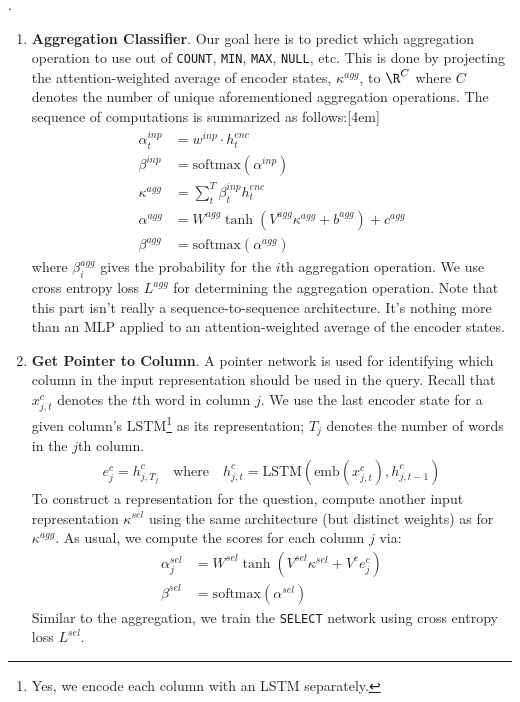 \documentclass[11pt]{article}
\begin{document}
\myspace
\p {}.
\begin{enumerate}
	\item \textbf{Aggregation Classifier}. Our goal here is to predict which aggregation operation to use out of \texttt{COUNT}, \texttt{MIN}, \texttt{MAX}, \texttt{NULL}, etc. This is done by projecting the attention-weighted average of encoder states, $\kappa^{agg}$, to $\R^{C}$ where $C$ denotes the number of unique aforementioned aggregation operations. The sequence of computations is summarized as follows:[4em]
	\begin{align}
	\alpha_t^{inp} 	&= w^{inp} \cdot h_t^{enc} \label{seq2sql-attn} \\
	\beta^{inp} 	&= \text{softmax}\left( \alpha^{inp} \right) \\
	\kappa^{agg} 	&= \sum_t^T \beta_t^{inp} h_t^{enc} \\
	\alpha^{agg} 	&= W^{agg} \tanh\left( V^{agg} \kappa^{agg} + b^{agg} \right) + c^{agg} \\
	\beta^{agg} 	&= \text{softmax}\left( \alpha^{agg} \right)
	\end{align}
	where $\beta_i^{agg}$ gives the probability for the $i$th aggregation operation. We use cross entropy loss $L^{agg}$ for determining the aggregation operation. Note that this part isn't really a sequence-to-sequence architecture. It's nothing more than an MLP applied to an attention-weighted average of the encoder states.
	
	
	\item \textbf{Get Pointer to Column}. A pointer network is used for identifying which column in the input representation should be used in the query. Recall that $x_{j,t}^c$ denotes the $t$th word in column $j$. We use the last encoder state for a given column's LSTM\footnote{Yes, we encode each column with an LSTM separately.} as its representation; $T_j$ denotes the number of words in the $j$th column.
	\begin{align}
	e_j^c = h_{j,T_j}^c \quad \text{where} \quad 
	h_{j,t}^c = \text{LSTM}\left( \text{emb}(x_{j,t}^c) , h_{j,t-1}^c \right)
	\end{align}
	To construct a representation for the question, compute another input representation $\kappa^{sel}$ using the same architecture (but distinct weights) as for $\kappa^{agg}$. As usual, we compute the scores for each column $j$ via:
	\begin{align}
	\alpha_j^{sel} &= W^{sel} \tanh\left( V^{sel} \kappa^{sel} + V^c e_j^c \right) \\
	\beta^{sel} &= \text{softmax}\left( \alpha^{sel} \right)
	\end{align}
	Similar to the aggregation, we train the \texttt{SELECT} network using cross entropy loss $L^{sel}$. 
	

\end{enumerate}
\end{document}
